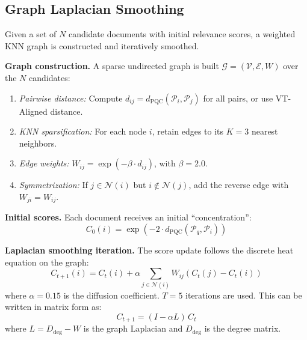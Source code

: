 \documentclass[review,1p]{elsarticle}
\begin{document}
\subsection{Graph Laplacian Smoothing}
\label{subsec:graph-smoothing}

Given a set of $N$ candidate documents with initial relevance scores, a weighted KNN graph is constructed and iteratively smoothed.

\textbf{Graph construction.} A sparse undirected graph is built $\mathcal{G} = (\mathcal{V}, \mathcal{E}, W)$ over the $N$ candidates:
\begin{enumerate}[leftmargin=*]
\item \textit{Pairwise distance:} Compute $d_{ij} = d_{\mathrm{PQC}}(\mathcal{P}_i, \mathcal{P}_j)$ for all pairs, or use VT-Aligned distance.
\item \textit{KNN sparsification:} For each node $i$, retain edges to its $K = 3$ nearest neighbors.
\item \textit{Edge weights:} $W_{ij} = \exp(-\beta \cdot d_{ij})$, with $\beta = 2.0$.
\item \textit{Symmetrization:} If $j \in \mathcal{N}(i)$ but $i \notin \mathcal{N}(j)$, add the reverse edge with $W_{ji} = W_{ij}$.
\end{enumerate}

\textbf{Initial scores.} Each document receives an initial ``concentration'':
\begin{equation}
\label{eq:init-score}
C_0(i) = \exp(-2 \cdot d_{\mathrm{PQC}}(\mathcal{P}_q, \mathcal{P}_i))
\end{equation}

\textbf{Laplacian smoothing iteration.} The score update follows the discrete heat equation on the graph:
\begin{equation}
\label{eq:laplacian-update}
C_{t+1}(i) = C_t(i) + \alpha \sum_{j \in \mathcal{N}(i)} W_{ij} \left( C_t(j) - C_t(i) \right)
\end{equation}
where $\alpha = 0.15$ is the diffusion coefficient. $T = 5$ iterations are used. This can be written in matrix form as:
\begin{equation}
\label{eq:matrix-form}
C_{t+1} = (I - \alpha L)\, C_t
\end{equation}
where $L = D_{\mathrm{deg}} - W$ is the graph Laplacian and $D_{\mathrm{deg}}$ is the degree matrix.
\end{document}
